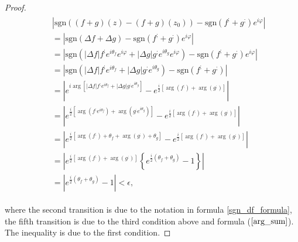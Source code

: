 \documentclass[11pt]{book}
\begin{document}
\begin{proof}
\begin{align}
&\begin{aligned}
&\left|\text{sgn}\left(\left(f+g\right)\left(z\right)-\left(f+g\right)\left(z_{0}\right)\right)-\text{sgn}\left(f^{;}+g^{;}\right)e^{i\varphi}\right| \\
&=\left|\text{sgn}\left(\Delta f+\Delta g\right)-\text{sgn}\left(f^{;}+g^{;}\right)e^{i\varphi}\right| \\
&=\left|\text{sgn}\left(\left|\Delta f\right|f^{;}e^{i\theta_{f}}e^{i\varphi}+\left|\Delta g\right|g^{;}e^{i\theta_{g}}e^{i\varphi}\right)-\text{sgn}\left(f^{;}+g^{;}\right)e^{i\varphi}\right| \\
&=\left|\text{sgn}\left(\left|\Delta f\right|f^{;}e^{i\theta_{f}}+\left|\Delta g\right|g^{;}e^{i\theta_{g}}\right)-\text{sgn}\left(f^{;}+g^{;}\right)\right| \\
&=\left|e^{i\arg\left[\left|\Delta f\right|f^{;}e^{i\theta_{f}}+\left|\Delta g\right|g^{;}e^{i\theta_{g}}\right]}-e^{\frac{i}{2}\left[\arg\left(f^{;}\right)+\arg\left(g^{;}\right)\right]}\right| \\
&=\left|e^{\frac{i}{2}\left[\arg\left(f^{;}e^{i\theta_{f}}\right)+\arg\left(g^{;}e^{i\theta_{g}}\right)\right]}-e^{\frac{i}{2}\left[\arg\left(f^{;}\right)+\arg\left(g^{;}\right)\right]}\right| \\
&=\left|e^{\frac{i}{2}\left[\arg\left(f^{;}\right)+\theta_{f}+\arg\left(g^{;}\right)+\theta_{g}\right]}-e^{\frac{i}{2}\left[\arg\left(f^{;}\right)+\arg\left(g^{;}\right)\right]}\right| \\
&=\left|e^{\frac{i}{2}\left[\arg\left(f^{;}\right)+\arg\left(g^{;}\right)\right]}\left\{ e^{\frac{i}{2}\left(\theta_{f}+\theta_{g}\right)}-1\right\} \right| \\
&=\left|e^{\frac{i}{2}\left(\theta_{f}+\theta_{g}\right)}-1\right|<\epsilon,
\end{aligned}
\end{align}

where the second transition is due to the notation in formula \ref{sgn_df_formula}, the fifth transition is due to the third condition above and formula ($\ref{arg_sum}$). The inequality is due to the first condition.
\end{proof}
\end{document}
